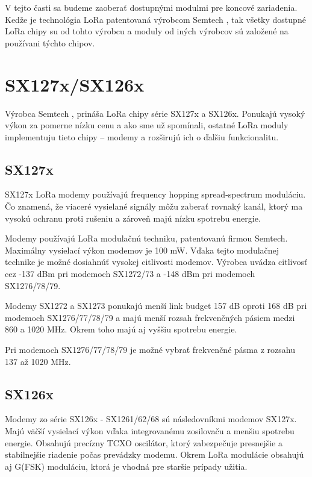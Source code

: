 \documentclass[slovak,master]{diploma}
\begin{document}
V tejto časti sa budeme zaoberať dostupnými modulmi pre koncové zariadenia.
Kedže je technológia LoRa patentovaná výrobcom Semtech \cite{semtech}, tak všetky dostupné LoRa chipy su od tohto výrobcu a moduly od iných výrobcov 
sú založené na používani týchto chipov.

\section{SX127x/SX126x}
Výrobca Semtech \cite{semtech}, prináša LoRa chipy série SX127x a SX126x. Ponukajú vysoký výkon za pomerne nízku cenu a ako sme už spomínali, ostatné LoRa moduly 
implementuju tieto chipy -- modemy a rozširujú ich o ďalšiu funkcionalitu.

\subsection{SX127x}

SX127x LoRa modemy používajú frequency hopping spread-spectrum moduláciu. Čo znamená, že viaceré vysielané signály môžu zaberať rovnaký kanál, ktorý ma vysokú ochranu proti rušeniu a zároveň majú nízku spotrebu energie. %

Modemy používajú LoRa modulačnú techniku, patentovanú firmou Semtech. Maximálny vysielací výkon modemov je 100 mW.
Vďaka tejto modulačnej technike je možné dosiahnúť vysokej citlivosti modemov.
Výrobca uvádza citlivosť cez -137 dBm pri modemoch SX1272/73 a -148 dBm pri modemoch SX1276/78/79.

Modemy SX1272 a SX1273 ponukajú menší link budget 157 dB oproti 168 dB pri modemoch SX1276/77/78/79 a majú menší rozsah frekvenčných pásiem medzi 860 a 1020 MHz.
Okrem toho majú aj vyššiu spotrebu energie.

Pri modemoch SX1276/77/78/79 je možné vybrať frekvenčné pásma z rozsahu 137 až 1020 MHz.

\subsection{SX126x}

Modemy zo série SX126x - SX1261/62/68 sú následovníkmi modemov SX127x. Majú väčší vysielací výkon vďaka integrovanému zosilovaču a menšiu spotrebu energie. Obsahujú precízny TCXO oscilátor, 
ktorý zabezpečuje presnejšie a stabilnejšie riadenie počas prevádzky modemu. Okrem LoRa modulácie obsahujú aj G(FSK) moduláciu, ktorá je vhodná pre staršie 
prípady užitia.
\end{document}
